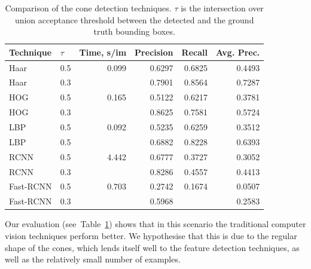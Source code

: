\documentclass[a4paper, 10pt, conference]{ieeeconf}      %
\begin{document}
\begin{table}
  \centering
  \vspace{-4ex}
  \caption{Comparison of the cone detection techniques. {\Large$\tau$} is the
    intersection over union
    acceptance threshold between the detected and the ground truth bounding boxes.}
  \begin{tabular}{llrrrr}
    \toprule
    Technique&{\Large$\tau$}&Time, s/im&Precision&Recall&Avg. Prec.\\
             \midrule
    Haar& 0.5&0.099&0.6297&0.6825&0.4493\\
    Haar& 0.3& &0.7901 &0.8564 &0.7287\\
    HOG& 0.5&0.165 &0.5122& 0.6217& 0.3781\\
    HOG& 0.3& & 0.8625 & 0.7581 & 0.5724\\
    LBP& 0.5&0.092 &0.5235 &0.6259 &0.3512\\
    LBP& 0.5& &0.6882 &0.8228 &0.6393\\
    RCNN& 0.5&4.442 &0.6777 &0.3727 &0.3052\\
    RCNN& 0.3& &0.8286 &0.4557 &0.4413\\
    Fast-RCNN& 0.5&0.703 &0.2742 &0.1674 &0.0507\\
    Fast-RCNN& 0.3& &0.5968& & 0.2583\\
    \bottomrule
  \end{tabular}
  \label{tab:cone}
\end{table}
Our evaluation (see~Table~\ref{tab:cone}) shows that in this scenario the traditional computer vision
techniques perform better. We hypothesise that this is due to the regular shape of
the cones, which lends itself well to the feature detection techniques, as
well as the relatively small number of examples.
\end{document}
